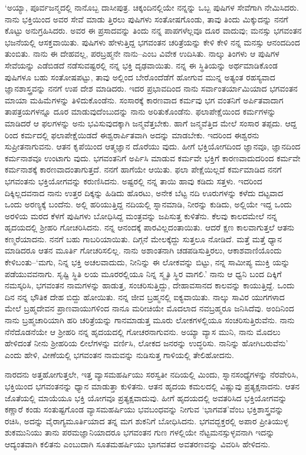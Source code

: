 ‘ಅಯ್ಯಾ, ಪೂರ್ವಜನ್ಮದಲ್ಲಿ ನಾನೊಬ್ಬ ದಾಸೀಪುತ್ರ. ಚಿಕ್ಕಂದಿನಲ್ಲಿಯೇ ನನ್ನನ್ನು ಒಬ್ಬ ಪುಷಿಗಳ ಸೇವೆಗಾಗಿ ನೇಮಿಸಿದರು. ನಾನು ಭಕ್ತಿಯಿಂದ ಅವರ ಸೇವೆ ಮಾಡು ತ್ತಿರಲು ಪುಷಿಗಳು ಸಂತೋಷಗೊಂಡು, ತಾವು ತಿಂದು ಮಿಕ್ಕುದನ್ನು ನನಗೆ ಕೊಟ್ಟು ಅನುಗ್ರಹಿಸಿದರು. ಅವರ ಈ ಪ್ರಸಾದವನ್ನು ತಿಂದು ನನ್ನ ಪಾಪಗಳೆಲ್ಲವೂ ದೂರ ವಾದುವು; ಮನಸ್ಸು ಭಗವಂತನ ಭಜನೆಯಲ್ಲಿ ಆಸಕ್ತವಾಯಿತು. ಪುಷಿಗಳು ಹೇಳುತ್ತಿದ್ದ ಭಗವಂತನ ಚರಿತ್ರೆಯನ್ನು ಕೇಳಿ ಕೇಳಿ ನನ್ನ ಮನಸ್ಸು ಆನಂದದಿಂದ ತುಂಬಿತು. ನಾನು ಈ ದೇಹವಲ್ಲ, ಪರಬ್ರಹ್ಮನೇ ನಾನು–ಎಂಬ ವಿವೇಕ ಉದಿಸಿತು. ನಾಲ್ಕು ತಿಂಗಳು ಆ ಪುಷಿಗಳ ಸೇವೆಯನ್ನು ಎಡೆಬಿಡದೆ ನಡೆಸುವಷ್ಟರಲ್ಲಿ ನನ್ನ ಭಕ್ತಿ ದೃಢವಾಯಿತು. ನನ್ನ ಈ ಸ್ಥಿತಿಯನ್ನು ಅರ್ಥಮಾಡಿಕೊಂಡ ಪುಷಿಗಳೂ ಬಹು ಸಂತೋಷಪಟ್ಟು, ತಾವು ಅಲ್ಲಿಂದ ಬೇರೊಂದೆಡೆಗೆ ಹೋಗುವ ಮುನ್ನ ಅತ್ಯಂತ ರಹಸ್ಯವಾದ ಜ್ಞಾನಶಾಸ್ತ್ರವನ್ನು ನನಗೆ ಉಪ ದೇಶ ಮಾಡಿದರು. ಇದರ ಪ್ರಭಾವದಿಂದ ನಾನು ಸರ್ವಾಂತರ್ಯಾಮಿಯಾದ ಭಗವಂತನ ಮಾಯಾ ಮಹಿಮೆಗಳನ್ನು ತಿಳಿದುಕೊಂಡೆನು. ಸಂಸಾರಕ್ಕೆ ಕಾರಣವಾದ ಕರ್ಮವು ಭಗ ವಂತನಿಗೆ ಅರ್ಪಿತವಾದಾಗ ತಾಪತ್ರಯಗಳನ್ನೂ ದೂರ ಮಾಡುವುದೆಂಬುದನ್ನು ನಾನು ಅರಿತುಕೊಂಡೆನು. ಫಲಾಪೇಕ್ಷೆಯಿಂದ ಕರ್ಮಗಳನ್ನು ಮಾಡಿದರೆ ಆ ಫಲಗಳನ್ನು ಅನು ಭವಿಸುವುದಕ್ಕಾಗಿ ಜನ್ಮವೆತ್ತಬೇಕು. ಹಾಗೆ ಜನ್ಮವೆತ್ತಿದ ಮೇಲೆ ಸಂಸಾರ ತಪ್ಪದು. ಆದ್ದ ರಿಂದ ಕರ್ಮದಲ್ಲಿ ಫಲಾಪೇಕ್ಷೆಯಿಡದೆ ಈಶ್ವರಾರ್ಪಿತವಾಗಿ ಅದನ್ನು ಮಾಡಬೇಕು. ಇದರಿಂದ ಈಶ್ವರನು ಸುಪ್ರೀತನಾಗುವನು. ಆತನ ಕೃಪೆಯಿಂದ ಆತ್ಮಜ್ಞಾನ ದೊರೆಯು ವುದು. ಹೀಗೆ ಭಕ್ತಿಯೋಗದಿಂದ ಜ್ಞಾನವೂ, ಜ್ಞಾನದಿಂದ ಕರ್ಮನಾಶವೂ ಉಂಟಾಗು ವುದು. ಭಗವಂತನಿಗೆ ಅರ್ಪಿಸಿ ಮಾಡುವ ಕರ್ಮವೇ ಭಕ್ತಿಗೆ ಕಾರಣವಾದುದರಿಂದ ಕರ್ಮವೇ ಕರ್ಮನಾಶಕ್ಕೆ ಕಾರಣವಾದಂತಾಗುತ್ತದೆ. ನನಗೆ ಹಾಗೆಯೇ ಆಯಿತು. ಫಲಾ ಪೇಕ್ಷೆಯಿಲ್ಲದೆ ಕರ್ಮಮಾಡಿದ ನನಗೆ ಭಗವಂತನು ಭಕ್ತಿಯೋಗವನ್ನು ಕರುಣಿಸಿದನು. ಅಷ್ಟರಲ್ಲಿ ನನ್ನ ತಾಯಿ ಹಾವು ಕಡಿದು ಸತ್ತಳು. ಇದರಿಂದ ದಿಕ್ಕಿಲ್ಲದವನಾದ ನಾನು ಉತ್ತರ ದಿಕ್ಕನ್ನು ಹಿಡಿದು ಹೊರಟು, ಅನೇಕ ಬೆಟ್ಟ ನದಿ ಊರುಗಳನ್ನು ಕಳೆದು ದಟ್ಟವಾದ ಒಂದು ಅರಣ್ಯಕ್ಕೆ ಬಂದೆನು. ಅಲ್ಲಿ ಹರಿಯುತ್ತಿದ್ದ ನದಿಯಲ್ಲಿ ಸ್ನಾನಮಾಡಿ, ನೀರನ್ನು ಕುಡಿದು, ಅಲ್ಲಿಯೇ ಇದ್ದ ಒಂದು ಅರಳಿಯ ಮರದ ಕೆಳಗೆ ಪುಷಿಗಳು ಬೋಧಿಸಿದ್ದ ಮಂತ್ರವನ್ನು ಜಪಿಸುತ್ತ ಕುಳಿತೆನು. ಕೆಲವು ಕಾಲದಮೇಲೆ ನನ್ನ ಹೃದಯದಲ್ಲಿ ಶ್ರೀಹರಿ ಗೋಚರಿಸಿದನು. ನನ್ನ ಆನಂದಕ್ಕೆ ಪಾರವಿಲ್ಲದಂತಾಯಿತು. ಆದರೆ ಕ್ಷಣ ಕಾಲವಾಗುತ್ತಲೆ ಆತನು ಕಣ್ಮರೆಯಾದನು. ನನಗೆ ಬಹು ಗಾಬರಿಯಾಯಿತು. ದಿಗ್ಗನೆ ಮೇಲಕ್ಕೆದ್ದು ಸುತ್ತಲೂ ನೋಡಿದೆ. ಮತ್ತೆ ಮತ್ತೆ ಧ್ಯಾನ ಮಾಡಿದರೂ ಆತನ ಮೂರ್ತಿ ಗೋಚರಿಸಲಿಲ್ಲ. ನಾನು ಅಶಾಂತನಾಗಿ ಚಡಪಡಿಸುತ್ತಿರಲು, ಆಕಾಶವಾಣಿಯೊಂದು ಕೇಳಿಬಂತು–‘ಮಗು, ನಿನ್ನ ಭಕ್ತಿ ಅಚಲವಾದುದು, ನೀನಿನ್ನು ಈ ಲೋಕವನ್ನು ಬಿಟ್ಟು, ನನ್ನ ಸಾಮೀಪ್ಯ ಮುಕ್ತಿ ಯನ್ನು ಪಡೆಯುವವನಾಗು. ಸೃಷ್ಟಿ ಸ್ಥಿತಿ ಲಯ ಮೂರರಲ್ಲಿಯೂ ನಿನ್ನ ಸ್ಮೃತಿ ಸ್ಥಿರ ವಾಗಲಿ.’ ನಾನು ಆ ಧ್ವನಿ ಬಂದ ದಿಕ್ಕಿಗೆ ನಮಸ್ಕರಿಸಿ, ಭಗವಂತನ ನಾಮಗಳನ್ನು ಹಾಡುತ್ತ, ಸಂಚರಿಸುತ್ತಿದ್ದು, ದೇಹಾವಸಾನದ ಕಾಲವನ್ನು ಕಾಯುತ್ತಿದ್ದೆ. ಒಂದು ದಿನ ನನ್ನ ಭೌತಿಕ ದೇಹ ಬಿದ್ದು ಹೋಯಿತು. ನನ್ನ ಜೀವ ಬ್ರಹ್ಮನಲ್ಲಿ ಐಕ್ಯವಾಯಿತು. ನಾಲ್ಕು ಸಾವಿರ ಯುಗಗಳಾದ ಮೇಲೆ ಬ್ರಹ್ಮದೇವನ ಪ್ರಾಣವಾಯುಗಳಿಂದ ನಾನೂ ಮರೀಚಿಯೇ ಮೊದಲಾದ ನವಬ್ರಹ್ಮರೂ ಜನಿಸಿದೆವು. ಅಂದಿನಿಂದ ನಾನು ಬ್ರಹ್ಮಚಾರಿಯಾಗಿ ಹರಿ ಚರಿತ್ರೆಯನ್ನು ಗಾನಮಾಡುತ್ತ ಮೂರು ಲೋಕಗಳಲ್ಲಿಯೂ ಸಂಚರಿಸುತ್ತಿರುವೆನು. ನಾನು ನೆನೆದೊಡನೆಯೇ ಆ ಶ್ರೀಹರಿ ನನ್ನ ಹೃದಯದಲ್ಲಿ ಗೋಚರನಾಗುವನು. ಅಯ್ಯಾ ವ್ಯಾಸ ಮುನಿ, ನಾನು ಮೊದಲು ಹೇಳಿದಂತೆ ನೀನು ಶ್ರೀಹರಿಯ ಲೀಲೆಗಳನ್ನು ವರ್ಣಿಸಿ, ಲೋಕದ ಜನರನ್ನು ಉದ್ಧರಿಸು. ನಾನಿನ್ನು ಹೋಗಿಬರುವೆನು’ ಎಂದು ಹೇಳಿ, ವೀಣೆಯಲ್ಲಿ ಭಗವಂತನ ನಾಮವನ್ನು ನುಡಿಸುತ್ತ ಗಾಳಿಯಲ್ಲಿ ತೇಲಿಹೋದನು.

ನಾರದನು ಅತ್ತಹೋಗುತ್ತಲೇ, ಇತ್ತ ವ್ಯಾಸಮಹರ್ಷಿಯು ಸರಸ್ವತೀ ನದಿಯಲ್ಲಿ ಮಿಂದು, ಸ್ನಾನಸಂಧ್ಯೆಗಳನ್ನು ನೆರವೇರಿಸಿ, ಭಕ್ತಿಯಿಂದ ಭಗವಂತನನ್ನು ಧ್ಯಾನ ಮಾಡುತ್ತಾ ಕುಳಿತನು. ಆತನ ಹೃದಯ ಕಮಲದಲ್ಲಿ ವಿಷ್ಣುವು ಪ್ರತ್ಯಕ್ಷನಾದನು. ಆತನ ಜೊತೆಯಲ್ಲಿ ಮಾಯೆಯೂ ಭಕ್ತಿ ಯೋಗವೂ ಪ್ರತ್ಯಕ್ಷವಾದುವು. ಹೀಗೆ ಹೃದಯದಲ್ಲಿ ಅವತರಿಸಿದ ಭಕ್ತಿಯೋಗವನ್ನು ಕಣ್ಣಾರೆ ಕಂಡು ಸಂತುಷ್ಟಗೊಂಡ ವ್ಯಾಸಮಹರ್ಷಿಯು ಭವಬಂಧವನ್ನು ನೀಗುವ ‘ಭಾಗವತ’ವೆಂಬ ಭಕ್ತಿಶಾಸ್ತ್ರವನ್ನು ರಚಿಸಿ, ಅದನ್ನು ವೈರಾಗ್ಯಮೂರ್ತಿಯಾದ ತನ್ನ ಮಗ ಶುಕನಿಗೆ ಬೋಧಿಸಿದನು. ಭಗವದ್ಭಕ್ತರಲ್ಲಿ ಅಪಾರ ಪ್ರೀತಿಯುಳ್ಳ ಶುಕಮುನಿಯು ತಾನು ಪರಮಜ್ಞಾನಿಯಾದರೂ ಭಗವಂತನ ಗುಣ ಗಳಲ್ಲಿಯೇ ನೆಟ್ಟಮನಸ್ಸುಳ್ಳವನಾಗಿ ಇದನ್ನು ಆದ್ಯಂತವಾಗಿ ಕಲಿತನು ಎಂಬುದಾಗಿ ಸೂತಮಹರ್ಷಿಯು ಭಾಗವತದ ಅವತರಣವನ್ನು ವಿವರಿಸಿ ಹೇಳಿದನು.

